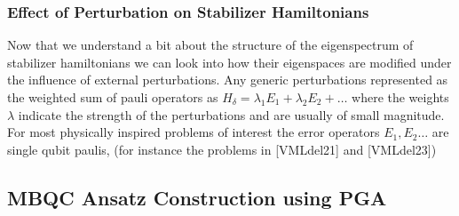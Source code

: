 \documentclass[
]{article}
\begin{document}
\hypertarget{effect-of-perturbation-on-stabilizer-hamiltonians}{%
\subsubsection{Effect of Perturbation on Stabilizer
Hamiltonians}\label{effect-of-perturbation-on-stabilizer-hamiltonians}}

Now that we understand a bit about the structure of the eigenspectrum of
stabilizer hamiltonians we can look into how their eigenspaces are
modified under the influence of external perturbations. Any generic
perturbations represented as the weighted sum of pauli operators as
\(H_{\delta} = \lambda_{1}E_{1} + \lambda_{2}E_{2} + \dots\) where the
weights \(\lambda\) indicate the strength of the perturbations and are
usually of small magnitude. For most physically inspired problems of
interest the error operators \(E_{1}, E_{2} \dots\) are single qubit
paulis, (for instance the problems in {[}VMLdel21{]} and {[}VMLdel23{]})

\hypertarget{mbqc-ansatz-construction-using-pga}{%
\subsection{MBQC Ansatz Construction using
PGA}\label{mbqc-ansatz-construction-using-pga}}
\end{document}
